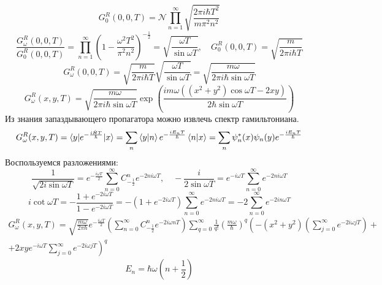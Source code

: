 \documentclass[12pt]{article}
\theoremstyle{definition}
\begin{document}
\begin{equation}
    G^R_0(0,0,T)=\mathcal{N}\prod\limits_{n=1}^\infty\sqrt{\frac{2\pi i\hbar T^2}{m\pi^2n^2}}
\end{equation}
\begin{equation}
    \frac{G^R_\omega(0,0,T)}{G^R_0(0,0,T)}=\prod\limits_{n=1}^\infty\left(1-\frac{\omega^2T^2}{\pi^2n^2}\right)^{-\frac{1}{2}}=\sqrt{\frac{\omega T}{\sin\omega T}},\quad G^R_0(0,0,T)=\sqrt{\frac{m}{2\pi i\hbar T}}
\end{equation}
\begin{equation}
    G^R_\omega(0,0,T)=\sqrt{\frac{m}{2\pi i\hbar T}}\sqrt{\frac{\omega T}{\sin\omega T}}=\sqrt{\frac{m\omega}{2\pi i\hbar\sin\omega T}}
\end{equation}
\begin{equation}
    \boxed{G_\omega^R(x,y,T)=\sqrt{\frac{m\omega}{2\pi i\hbar\sin\omega T}}\exp\left(\frac{im\omega((x^2+y^2)\cos\omega T-2xy)}{2\hbar\sin\omega T}\right)}
\end{equation}
Из знания запаздывающего пропагатора можно извлечь спектр гамильтониана.
\begin{equation}
    G_\omega^R(x,y,T)=\braket{y|e^{-\frac{i\hat{H}T}{\hbar}}|x}=\sum\limits_n\braket{y|n}e^{-\frac{iE_nT}{\hbar}}\braket{n|x}=\sum\limits_n\psi^*_n(x)\psi_n(y)e^{-\frac{iE_nT}{\hbar}}
\end{equation}
Воспользуемся разложениями:
\begin{equation}
    \frac{1}{\sqrt{2i\sin\omega T}}=e^{-\frac{i\omega T}{2}}\sum_{n=0}^{\infty}C^n_{-\frac{1}{2}}e^{-2ni\omega T},\quad -\frac{i}{2\sin\omega T}=e^{-i\omega T}\sum_{n=0}^{\infty}e^{-2ni\omega T}
\end{equation}
\begin{equation}
    i\cot\omega T=-\frac{1+e^{-2i\omega T}}{1-e^{-2i\omega T}}=-\left(1+e^{-2i\omega T}\right)\sum_{n=0}^{\infty}e^{-2ni\omega T}=-2\sum_{n=0}^{\infty}e^{-2in\omega T}
\end{equation}
\begin{multline}
    G_\omega^R(x,y,T)=\sqrt{\frac{m\omega}{2\pi\hbar}}e^{-\frac{i\omega T}{2}}\left(\sum_{n=0}^{\infty}C^n_{-\frac{1}{2}}e^{-2i\omega nT}\right)\sum_{q=0}^{\infty}\frac{1}{q!}\left(\frac{m\omega}{\hbar}\right)^{q}\left(-(x^2+y^2)\left(\sum_{j=0}^{\infty}e^{-2i\omega jT}\right)+\right.\\\left.+2xye^{-i\omega T}\sum_{j=0}^{\infty}e^{-2i\omega jT}\right)^{q}
\end{multline}
\begin{equation}
    \boxed{E_{n}=\hbar\omega\left(n+\frac{1}{2}\right)}
\end{equation}
\end{document}
